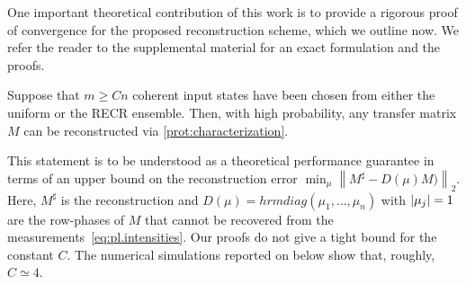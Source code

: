 One important theoretical contribution of this work is to provide a rigorous proof of convergence for the proposed reconstruction scheme, which we outline now.
We refer the reader to the supplemental material for an exact formulation and the proofs.
\begin{theorem}%
  \label{thm:performance_guarantee}
  Suppose that $m \geq Cn$ coherent input states have been chosen from either the uniform or the RECR ensemble.
  Then, with high probability, any transfer matrix ${M}$ can be reconstructed via \cref{prot:characterization}.
\end{theorem}

This statement is to be understood as a theoretical performance guarantee in terms of an upper bound on the reconstruction error
\(
  \min_{{\mu}}\left\| {M}^\sharp -  {D} ({\mu}) {M}) \right\|_2.
\)
Here, ${M}^\sharp$ is the reconstruction and ${D}(\mu) = hrm{diag}(\mu_1, \ldots, \mu_n)$ with ${\vert\mu_j\vert} = 1$ are the row-phases of ${M}$ that cannot be  recovered from the measurements~\eqref{eq:pl.intensities}.
Our proofs do not give a tight bound for the constant $C$.
The numerical simulations reported on below show that, roughly, $C\simeq 4$.



